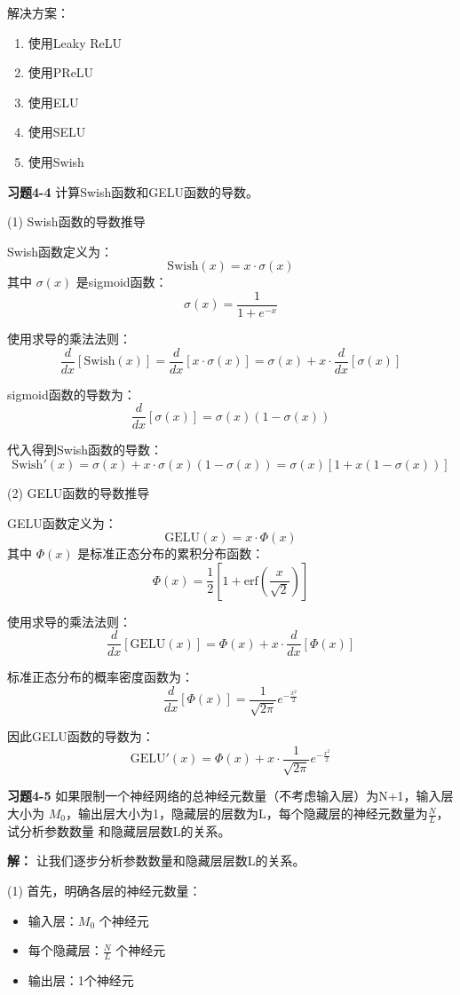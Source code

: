解决方案：
\begin{enumerate}
    \item 使用Leaky ReLU
    \item 使用PReLU
    \item 使用ELU
    \item 使用SELU
    \item 使用Swish
\end{enumerate}

\noindent\textbf{习题4-4} 计算Swish函数和GELU函数的导数。

(1) Swish函数的导数推导

Swish函数定义为：
\[
\text{Swish}(x) = x \cdot \sigma(x)
\]
其中 $\sigma(x)$ 是sigmoid函数：
\[
\sigma(x) = \frac{1}{1 + e^{-x}}
\]

使用求导的乘法法则：
\[
\frac{d}{dx}[\text{Swish}(x)] = \frac{d}{dx}[x \cdot \sigma(x)] = \sigma(x) + x \cdot \frac{d}{dx}[\sigma(x)]
\]

sigmoid函数的导数为：
\[
\frac{d}{dx}[\sigma(x)] = \sigma(x)(1-\sigma(x))
\]

代入得到Swish函数的导数：
\[
\text{Swish}'(x) = \sigma(x) + x \cdot \sigma(x)(1-\sigma(x)) = \sigma(x)[1 + x(1-\sigma(x))]
\]

(2) GELU函数的导数推导

GELU函数定义为：
\[
\text{GELU}(x) = x \cdot \Phi(x)
\]
其中 $\Phi(x)$ 是标准正态分布的累积分布函数：
\[
\Phi(x) = \frac{1}{2}\left[1 + \text{erf}\left(\frac{x}{\sqrt{2}}\right)\right]
\]

使用求导的乘法法则：
\[
\frac{d}{dx}[\text{GELU}(x)] = \Phi(x) + x \cdot \frac{d}{dx}[\Phi(x)]
\]

标准正态分布的概率密度函数为：
\[
\frac{d}{dx}[\Phi(x)] = \frac{1}{\sqrt{2\pi}}e^{-\frac{x^2}{2}}
\]

因此GELU函数的导数为：
\[
\text{GELU}'(x) = \Phi(x) + x \cdot \frac{1}{\sqrt{2\pi}}e^{-\frac{x^2}{2}}
\]

\noindent\textbf{习题4-5} 如果限制一个神经网络的总神经元数量（不考虑输入层）为N+1，输入层大小为
$M_0$，输出层大小为1，隐藏层的层数为L，每个隐藏层的神经元数量为$\frac{N}{L}$，试分析参数数量
和隐藏层层数L的关系。

\noindent\textbf{解：} 让我们逐步分析参数数量和隐藏层层数L的关系。

(1) 首先，明确各层的神经元数量：
\begin{itemize}
    \item 输入层：$M_0$ 个神经元
    \item 每个隐藏层：$\frac{N}{L}$ 个神经元
    \item 输出层：1个神经元
\end{itemize}

